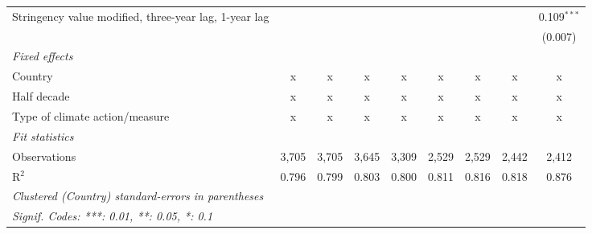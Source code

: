 \begin{table}[htbp]
\begin{tabular}{lcccccccc}
      Stringency value modified, three-year lag, 1-year lag                            &                &                &                &               &               &               &               & 0.109$^{***}$\\   
                                                                                       &                &                &                &               &               &               &               & (0.007)\\   
      \emph{Fixed effects}\\
      Country                                                                          & x              & x              & x              & x             & x             & x             & x             & x\\  
      Half decade                                                                      & x              & x              & x              & x             & x             & x             & x             & x\\  
      Type of climate action/measure                                                   & x              & x              & x              & x             & x             & x             & x             & x\\  
      \midrule \emph{Fit statistics}\\
      Observations                                                                     & 3,705          & 3,705          & 3,645          & 3,309         & 2,529         & 2,529         & 2,442         & 2,412\\  
      R$^2$                                                                            & 0.796          & 0.799          & 0.803          & 0.800         & 0.811         & 0.816         & 0.818         & 0.876\\  
      \midrule
      \multicolumn{9}{l}{\emph{Clustered (Country) standard-errors in parentheses}}\\
      \multicolumn{9}{l}{\emph{Signif. Codes: ***: 0.01, **: 0.05, *: 0.1}}\\
   \end{tabular}
\end{table}


